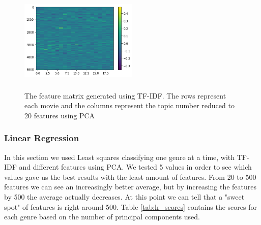 \documentclass[11pt]{article}
\begin{document}


\begin{figure}[ht]
	\centering
		\includegraphics[width=0.5\textwidth,height=5cm]{TF-IDF.png}
	\caption{The feature matrix generated using TF-IDF. The rows represent each movie and the columns represent the topic number reduced to 20 features using PCA}
	\label{fig:tfidf}
\end{figure}

\label{sec:tfidf}

\subsubsection{Linear Regression}

In this section we used Least squares classifying one genre at a time, with TF-IDF and different features using PCA. We tested 5 values in order to see which values gave us the best results with the least amount of features. From 20 to 500 features we can see an increasingly better average, but by increasing the features by 500 the average actually decreases. At this point we can tell that a "sweet spot" of features is right around 500. Table \ref{tab:lr_scores} contains the scores for each genre based on the number of principal components used.
\end{document}
